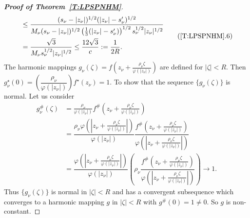 \documentclass[11pt, reqno]{amsart}
\theoremstyle{definition}
\theoremstyle{remark}
\numberwithin{equation}{section}
\begin{document}
\begin{proof}[{\bf Proof of Theorem~\ref{T:LPSPNHM}}]
\begin{align*}
\begin{split}
&\leq \frac{(s_{\nu} - |z_{\nu}|)^{1/2}(|z_{\nu}| - s_{\nu}')^{1/2}}{M_{\nu}(s_{\nu} - |z_{\nu}|)^{1/2}\left(\frac{1}{3}(|z_{\nu}| - s_{\nu}')\right)^{1/2} s_{\nu}^{1/2} |z_{\nu}|^{1/2}} \\
&= \frac{\sqrt{3}}{M_{\nu} s_{\nu}^{1/2} |z_{\nu}|^{1/2}} \leq \frac{12\sqrt{3}}{c} := \frac{1}{2R}.
\end{split}\label{LPSPNHM.6} \tag{\ref*{T:LPSPNHM}.6}
\end{align*}
The harmonic mappings $g_{\nu}(\zeta)=f\left(z_{\nu}+\frac{\rho_{\nu} \zeta}{\varphi(|z_{\nu}|)}\right)$ are defined for $|\zeta|<R$.
Then $g_{\nu}^\star(0)=\left(\dfrac{\rho_{\nu} }{\varphi(|z_{\nu}|)}\right)f^\star(z_{\nu})=1$. To 
show that the sequence $\{g_{\nu}(\zeta)\}$ is normal. Let us consider
\begin{align*} g_{\nu}^\#(\zeta)&=\frac{\rho_{\nu} }{\varphi(|z_{\nu}|)}f^\#\left(z_{\nu}+\frac{\rho_{\nu} \zeta}{\varphi(|z_{\nu}|)}\right)\\ &=\dfrac{\rho_{\nu} \varphi\left(\left|z_{\nu}+\frac{\rho_{\nu} \zeta}{\varphi(|z_{\nu}|)}\right|\right)}{\varphi(|z_{\nu}|)} \dfrac{f^\#\left(z_{\nu}+\frac{\rho_{\nu} \zeta}{\varphi(|z_{\nu}|)}\right)}{\varphi\left(\left|z_{\nu}+\frac{\rho_{\nu} \zeta}{\varphi(|z_{\nu}|)}\right|\right)}\\ &= \dfrac{\varphi\left(\left|z_{\nu}+\frac{\rho_{\nu} \zeta}{\varphi(|z_{\nu}|)}\right|\right)}{\varphi(|z_{\nu}|)} \left(\rho_{\nu} \dfrac{f^\#\left(z_{\nu}+\frac{\rho_{\nu} \zeta}{\varphi(|z_{\nu}|)}\right)}{\varphi\left(\left|z_{\nu}+\frac{\rho_{\nu} \zeta}{\varphi(|z_{\nu}|)}\right|\right)}\right)\to 1.\end{align*}
Thus $\{g_{\nu}(\zeta)\}$ is normal in $|\zeta|<R$ and has a convergent subsequence which converges to a 
harmonic mapping $g$ in $|\zeta|<R$ with $g^\#(0)=1\neq0$. So $g$ is non-constant. \smallskip


\end{proof}
\end{document}
